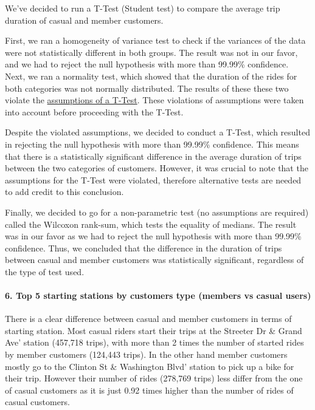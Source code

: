 \documentclass[
]{article}
\begin{document}
We've decided to run a T-Test (Student test) to compare the average trip
duration of casual and member customers.

First, we ran a homogeneity of variance test to check if the variances
of the data were not statistically different in both groups. The result
was not in our favor, and we had to reject the null hypothesis with more
than 99.99\% confidence. Next, we ran a normality test, which showed
that the duration of the rides for both categories was not normally
distributed. The results of these these two violate the
\href{fourth_step__analysis.Rmd}{assumptions of a T-Test}. These
violations of assumptions were taken into account before proceeding with
the T-Test.

Despite the violated assumptions, we decided to conduct a T-Test, which
resulted in rejecting the null hypothesis with more than 99.99\%
confidence. This means that there is a statistically significant
difference in the average duration of trips between the two categories
of customers. However, it was crucial to note that the assumptions for
the T-Test were violated, therefore alternative tests are needed to add
credit to this conclusion.

Finally, we decided to go for a non-parametric test (no assumptions are
required) called the Wilcoxon rank-sum, which tests the equality of
medians. The result was in our favor as we had to reject the null
hypothesis with more than 99.99\% confidence. Thus, we concluded that
the difference in the duration of trips between casual and member
customers was statistically significant, regardless of the type of test
used.

\hypertarget{top-5-starting-stations-by-customers-type-members-vs-casual-users}{%
\paragraph{6. Top 5 starting stations by customers type (members vs
casual
users)}\label{top-5-starting-stations-by-customers-type-members-vs-casual-users}}

There is a clear difference between casual and member customers in terms
of starting station. Most casual riders start their trips at the
Streeter Dr \& Grand Ave' station (457,718 trips), with more than 2
times the number of started rides by member customers (124,443 trips).
In the other hand member customers mostly go to the Clinton St \&
Washington Blvd' station to pick up a bike for their trip. However their
number of rides (278,769 trips) less differ from the one of casual
customers as it is just 0.92 times higher than the number of rides of
casual customers.
\end{document}
